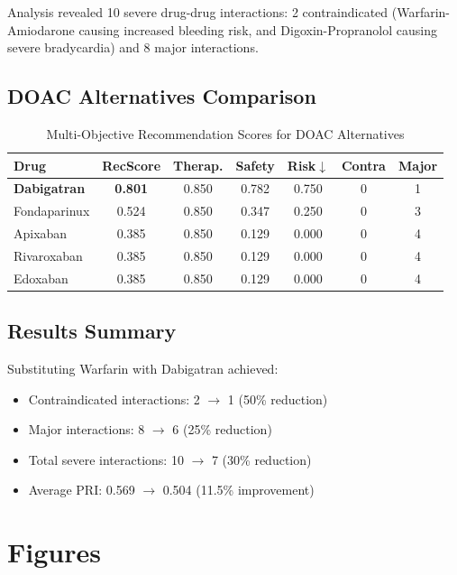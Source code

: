 \documentclass[11pt,a4paper]{article}
\begin{document}
Analysis revealed 10 severe drug-drug interactions: 2 contraindicated (Warfarin-Amiodarone causing increased bleeding risk, and Digoxin-Propranolol causing severe bradycardia) and 8 major interactions.

\subsection*{DOAC Alternatives Comparison}

\begin{table}[H]
\centering
\caption{Multi-Objective Recommendation Scores for DOAC Alternatives}
\label{tab:doac_alternatives}
\begin{tabular}{@{}lcccccc@{}}
\toprule
\textbf{Drug} & \textbf{RecScore} & \textbf{Therap.} & \textbf{Safety} & \textbf{Risk$\downarrow$} & \textbf{Contra} & \textbf{Major} \\
\midrule
\textbf{Dabigatran} & \textbf{0.801} & 0.850 & 0.782 & 0.750 & 0 & 1 \\
Fondaparinux & 0.524 & 0.850 & 0.347 & 0.250 & 0 & 3 \\
Apixaban & 0.385 & 0.850 & 0.129 & 0.000 & 0 & 4 \\
Rivaroxaban & 0.385 & 0.850 & 0.129 & 0.000 & 0 & 4 \\
Edoxaban & 0.385 & 0.850 & 0.129 & 0.000 & 0 & 4 \\
\bottomrule
\end{tabular}
\end{table}

\subsection*{Results Summary}

Substituting Warfarin with Dabigatran achieved:
\begin{itemize}
    \item Contraindicated interactions: 2 $\rightarrow$ 1 (50\% reduction)
    \item Major interactions: 8 $\rightarrow$ 6 (25\% reduction)
    \item Total severe interactions: 10 $\rightarrow$ 7 (30\% reduction)
    \item Average PRI: 0.569 $\rightarrow$ 0.504 (11.5\% improvement)
\end{itemize}

\section*{Figures}
\end{document}
